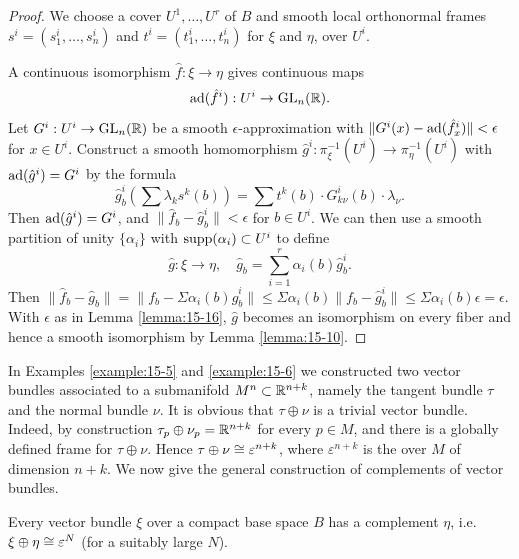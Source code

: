 \begin{proof}
  We choose a cover $U^1,\ldots, U^r$ of $B$ and smooth local orthonormal frames
  $s^i = (s_1^i,\ldots, s_n^i)$ and $t^i = (t_1^i,\ldots,t_n^i)$ for $\xi$ and $\eta$, over $U^i$.

  A continuous isomorphism $\hat f:\xi\to \eta$ gives continuous maps
  \[
    \mathrm{ad}(\hat f^i):U^i\to\mathrm{GL}_n({\mathbb{R}}).
  \]
  Let $G^i:U^i\to\mathrm{GL}_n({\mathbb{R}})$ be a smooth $\epsilon$-approximation with $\|G^i(x)-\mathrm{ad}(\hat f^i_x)\|<\epsilon$
  for $x\in U^i$. Construct a smooth homomorphism $\hat g^i:\pi^{-1}_\xi(U^i)\to \pi^{-1}_\eta(U^i)$ with 
  $\mathrm{ad}(\hat g^i) = G^i$ by the formula 
  \[
    \hat g^i_b \left(\sum \lambda_k s^k(b)\right) 
    = \sum t^k(b)\cdot G^i_{k\nu}(b)\cdot\lambda_\nu.
  \]
  Then $\mathrm{ad}(\hat g^i)=G^i$, and $\|\hat f_b-\hat g^i_b\|<\epsilon$ for $b\in U^i$. We can then use a smooth 
  partition of unity $\{\alpha_i\}$ with $\operatorname{supp}(\alpha_i)\subset U^i$ to define 
  \[
    \hat g:\xi\to\eta,\quad 
    \hat g_b = \sum_{i=1 }^{r }{\alpha_i(b)\hat g_b^i}.
  \] 
  Then $\|\hat f_b-\hat g_b\| = \|f_b-\Sigma\alpha_i(b)\hat g_b^i\|\le \Sigma\alpha_i(b)\|f_b-\hat g_b^i\|\le\Sigma\alpha_i(b)\epsilon=\epsilon$.
  With $\epsilon$ as in Lemma \ref{lemma:15-16}, $\hat g$ becomes an isomorphism on every fiber and hence a smooth 
  isomorphism by Lemma \ref{lemma:15-10}.
\end{proof}

In Examples \ref{example:15-5} and \ref{example:15-6} we constructed two vector bundles associated to a
submanifold $M^n\subset {\ensuremath{\mathbb{R}}}^{n +k}$, namely the tangent bundle $\tau$ and the normal bundle
$\nu$. It is obvious that $\tau\oplus\nu$ is a trivial vector bundle. Indeed, by construction
$\tau_p\oplus\nu_p={\mathbb{R}}^{n+k}$ for every $p\in M$, and there is a globally defined frame for $\tau\oplus\nu$.
Hence $\tau\oplus\nu\cong \varepsilon^{n+k}$, where $\varepsilon^{n+k}$ is the  over $M$ of dimension
$n + k$. We now give the general construction of complements of vector bundles.

\begin{theorem}\label{theorem:15-18}
  Every vector bundle $\xi$ over a compact base space $B$ has a complement $\eta$, i.e. $\xi\oplus\eta\cong\varepsilon^N$ 
  (for a suitably large $N$).
\end{theorem}

